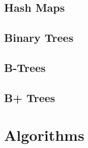 \documentclass[10pt,a4paper,titlepage]{book}
\begin{document}
\section{Hash Maps}

\vfill
\pagebreak
\section{Binary Trees}

\vfill
\pagebreak
\section{B-Trees}

\vfill
\pagebreak
\section{B+ Trees}

\vfill
\pagebreak
\chapter{Algorithms}

\vfill
\pagebreak
\end{document}
